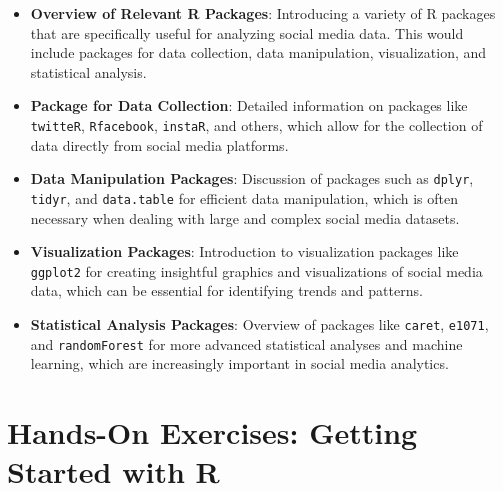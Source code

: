 \documentclass[
]{book}
\providecommand{\tightlist}{%
  \setlength{\itemsep}{0pt}\setlength{\parskip}{0pt}}
\begin{document}
\begin{itemize}
\tightlist
\item
  \textbf{Overview of Relevant R Packages}: Introducing a variety of R packages that are specifically useful for analyzing social media data. This would include packages for data collection, data manipulation, visualization, and statistical analysis.
\item
  \textbf{Package for Data Collection}: Detailed information on packages like \texttt{twitteR}, \texttt{Rfacebook}, \texttt{instaR}, and others, which allow for the collection of data directly from social media platforms.
\item
  \textbf{Data Manipulation Packages}: Discussion of packages such as \texttt{dplyr}, \texttt{tidyr}, and \texttt{data.table} for efficient data manipulation, which is often necessary when dealing with large and complex social media datasets.
\item
  \textbf{Visualization Packages}: Introduction to visualization packages like \texttt{ggplot2} for creating insightful graphics and visualizations of social media data, which can be essential for identifying trends and patterns.
\item
  \textbf{Statistical Analysis Packages}: Overview of packages like \texttt{caret}, \texttt{e1071}, and \texttt{randomForest} for more advanced statistical analyses and machine learning, which are increasingly important in social media analytics.
\end{itemize}

\hypertarget{hands-on-exercises-getting-started-with-r}{%
\section*{Hands-On Exercises: Getting Started with R}\label{hands-on-exercises-getting-started-with-r}}
\end{document}
